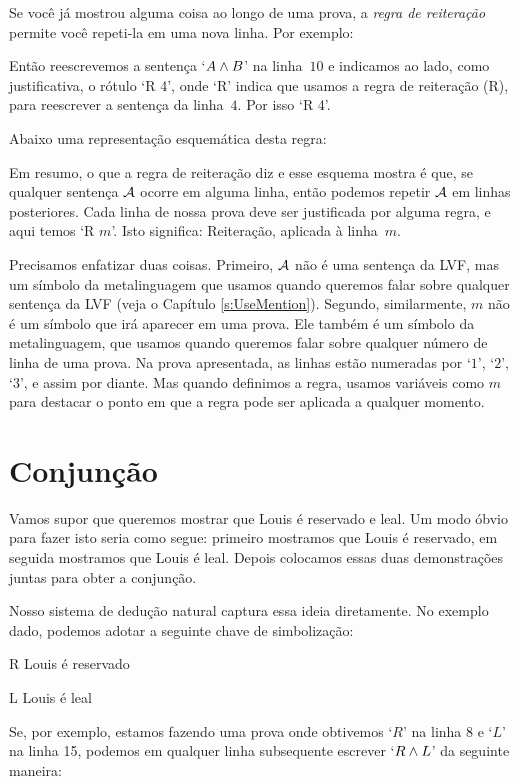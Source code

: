 Se você já mostrou alguma coisa ao longo de uma prova, a \emph{regra de reiteração} permite você repeti-la em uma nova linha. Por exemplo:

\begin{fitchproof}
	\have[$\vdots$]{}{\vdots}
	 
\end{fitchproof}
Então reescrevemos a sentença `$A \wedge B$'  na linha~$10$ e indicamos ao lado, como  justificativa, o rótulo `R 4', onde `R' indica que usamos a regra de reiteração (R), para reescrever a sentença da linha~$4$. Por isso `R 4'.

Abaixo uma representação esquemática desta regra:

Em resumo, o que a regra de reiteração diz e esse esquema mostra é que, se qualquer sentença $\mathcal{A}$ ocorre em alguma linha, então podemos repetir $\mathcal{A}$ em linhas posteriores. Cada linha de nossa prova deve  ser justificada por alguma regra, e aqui temos `R $m$'.   Isto significa:  Reiteração, aplicada à linha~$m$. 

 Precisamos enfatizar duas coisas.  Primeiro,   $\mathcal{A}$   não   é uma sentença da LVF,   mas um símbolo da metalinguagem que usamos quando queremos falar sobre qualquer sentença da LVF
 (veja o Capítulo \ref{s:UseMention}).   Segundo, similarmente,  $m$  não é um símbolo que irá aparecer em uma prova.  Ele também é um símbolo da metalinguagem, que usamos quando queremos falar sobre qualquer número de linha de uma prova. Na prova apresentada, as linhas  estão numeradas por `$1$', `$2$', `$3$', e assim por diante.  Mas quando definimos a regra, usamos variáveis como   $m$ para destacar o ponto em que a regra pode ser aplicada a qualquer momento. 

\section{Conjunção}
  Vamos supor que queremos mostrar que Louis é reservado e leal. Um modo óbvio para fazer isto seria como segue: primeiro mostramos que Louis é reservado, em seguida mostramos que Louis é leal. Depois colocamos essas duas demonstrações juntas para obter a conjunção.

Nosso sistema de dedução natural  captura  essa ideia diretamente. No exemplo dado, podemos adotar a seguinte chave de simbolização:
	\begin{ekey}
		\item[R] Louis é reservado
		\item[L] Louis é leal
	\end{ekey}
Se, por exemplo, estamos fazendo uma prova onde obtivemos `$R$'  na linha 8 e `$L$' na linha 15,  podemos em qualquer linha subsequente escrever `$R \wedge L$' da seguinte maneira:

